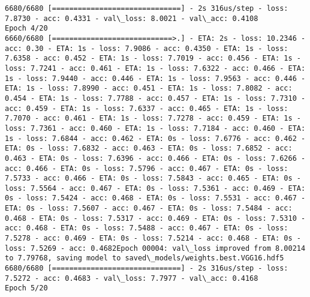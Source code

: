 \documentclass[11pt]{article}
\begin{document}
\begin{Verbatim}[commandchars=\\\{\}]
6680/6680 [==============================] - 2s 316us/step - loss: 7.8730 - acc: 0.4331 - val\_loss: 8.0021 - val\_acc: 0.4108
Epoch 4/20
6660/6680 [============================>.] - ETA: 2s - loss: 10.2346 - acc: 0.30 - ETA: 1s - loss: 7.9086 - acc: 0.4350 - ETA: 1s - loss: 7.6358 - acc: 0.452 - ETA: 1s - loss: 7.7019 - acc: 0.456 - ETA: 1s - loss: 7.7241 - acc: 0.461 - ETA: 1s - loss: 7.6322 - acc: 0.466 - ETA: 1s - loss: 7.9440 - acc: 0.446 - ETA: 1s - loss: 7.9563 - acc: 0.446 - ETA: 1s - loss: 7.8990 - acc: 0.451 - ETA: 1s - loss: 7.8082 - acc: 0.454 - ETA: 1s - loss: 7.7788 - acc: 0.457 - ETA: 1s - loss: 7.7310 - acc: 0.459 - ETA: 1s - loss: 7.6337 - acc: 0.465 - ETA: 1s - loss: 7.7070 - acc: 0.461 - ETA: 1s - loss: 7.7278 - acc: 0.459 - ETA: 1s - loss: 7.7361 - acc: 0.460 - ETA: 1s - loss: 7.7184 - acc: 0.460 - ETA: 1s - loss: 7.6844 - acc: 0.462 - ETA: 0s - loss: 7.6776 - acc: 0.462 - ETA: 0s - loss: 7.6832 - acc: 0.463 - ETA: 0s - loss: 7.6852 - acc: 0.463 - ETA: 0s - loss: 7.6396 - acc: 0.466 - ETA: 0s - loss: 7.6266 - acc: 0.466 - ETA: 0s - loss: 7.5796 - acc: 0.467 - ETA: 0s - loss: 7.5733 - acc: 0.466 - ETA: 0s - loss: 7.5843 - acc: 0.465 - ETA: 0s - loss: 7.5564 - acc: 0.467 - ETA: 0s - loss: 7.5361 - acc: 0.469 - ETA: 0s - loss: 7.5424 - acc: 0.468 - ETA: 0s - loss: 7.5531 - acc: 0.467 - ETA: 0s - loss: 7.5607 - acc: 0.467 - ETA: 0s - loss: 7.5484 - acc: 0.468 - ETA: 0s - loss: 7.5317 - acc: 0.469 - ETA: 0s - loss: 7.5310 - acc: 0.468 - ETA: 0s - loss: 7.5488 - acc: 0.467 - ETA: 0s - loss: 7.5278 - acc: 0.469 - ETA: 0s - loss: 7.5214 - acc: 0.468 - ETA: 0s - loss: 7.5269 - acc: 0.4682Epoch 00004: val\_loss improved from 8.00214 to 7.79768, saving model to saved\_models/weights.best.VGG16.hdf5
6680/6680 [==============================] - 2s 316us/step - loss: 7.5272 - acc: 0.4683 - val\_loss: 7.7977 - val\_acc: 0.4168
Epoch 5/20

\end{Verbatim}
\end{document}
